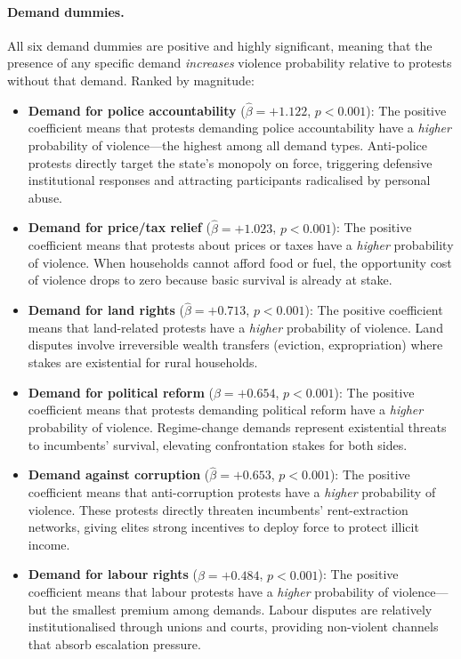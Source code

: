 \documentclass[12pt,a4paper]{article}
\begin{document}
\paragraph{Demand dummies.}
All six demand dummies are positive and highly significant, meaning that the presence of any specific demand \emph{increases} violence probability relative to protests without that demand. Ranked by magnitude:
\begin{itemize}
  \item \textbf{Demand for police accountability} ($\hat{\beta} = +1.122$, $p < 0.001$): The positive coefficient means that protests demanding police accountability have a \emph{higher} probability of violence---the highest among all demand types. Anti-police protests directly target the state's monopoly on force, triggering defensive institutional responses and attracting participants radicalised by personal abuse.
  \item \textbf{Demand for price/tax relief} ($\hat{\beta} = +1.023$, $p < 0.001$): The positive coefficient means that protests about prices or taxes have a \emph{higher} probability of violence. When households cannot afford food or fuel, the opportunity cost of violence drops to zero because basic survival is already at stake.
  \item \textbf{Demand for land rights} ($\hat{\beta} = +0.713$, $p < 0.001$): The positive coefficient means that land-related protests have a \emph{higher} probability of violence. Land disputes involve irreversible wealth transfers (eviction, expropriation) where stakes are existential for rural households.
  \item \textbf{Demand for political reform} ($\hat{\beta} = +0.654$, $p < 0.001$): The positive coefficient means that protests demanding political reform have a \emph{higher} probability of violence. Regime-change demands represent existential threats to incumbents' survival, elevating confrontation stakes for both sides.
  \item \textbf{Demand against corruption} ($\hat{\beta} = +0.653$, $p < 0.001$): The positive coefficient means that anti-corruption protests have a \emph{higher} probability of violence. These protests directly threaten incumbents' rent-extraction networks, giving elites strong incentives to deploy force to protect illicit income.
  \item \textbf{Demand for labour rights} ($\hat{\beta} = +0.484$, $p < 0.001$): The positive coefficient means that labour protests have a \emph{higher} probability of violence---but the smallest premium among demands. Labour disputes are relatively institutionalised through unions and courts, providing non-violent channels that absorb escalation pressure.
\end{itemize}
\end{document}
